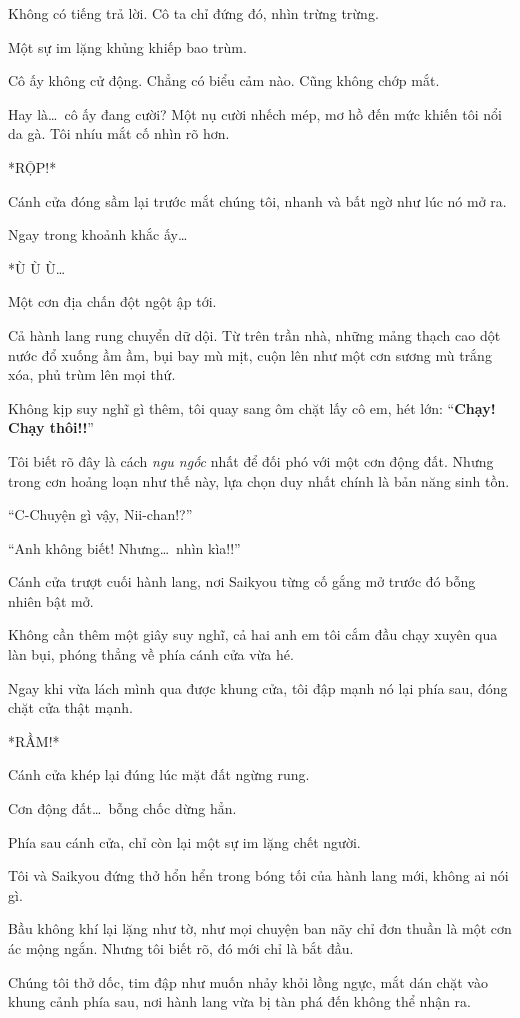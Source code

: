 \documentclass[../main.tex]{subfiles}
\begin{document}
Không có tiếng trả lời. Cô ta chỉ đứng đó, nhìn trừng trừng.

Một sự im lặng khủng khiếp bao trùm.

Cô ấy không cử động. Chẳng có biểu cảm nào. Cũng không chớp mắt.

Hay là\dots\ cô ấy đang cười? Một nụ cười nhếch mép, mơ hồ đến mức khiến tôi nổi da gà. Tôi nhíu mắt cố nhìn rõ hơn.

*RỘP!*

Cánh cửa đóng sầm lại trước mắt chúng tôi, nhanh và bất ngờ như lúc nó mở ra.

Ngay trong khoảnh khắc ấy\dots

*Ù Ù Ù\dots*

Một cơn địa chấn đột ngột ập tới.

Cả hành lang rung chuyển dữ dội. Từ trên trần nhà, những mảng thạch cao dột nước đổ xuống ầm ầm, bụi bay mù mịt, cuộn lên như một cơn sương mù trắng xóa, phủ trùm lên mọi thứ.

Không kịp suy nghĩ gì thêm, tôi quay sang ôm chặt lấy cô em, hét lớn: ``\textbf{Chạy! Chạy thôi!!}''

Tôi biết rõ đây là cách \emph{ngu ngốc} nhất để đối phó với một cơn động đất. Nhưng trong cơn hoảng loạn như thế này, lựa chọn duy nhất chính là bản năng sinh tồn.

``C-Chuyện gì vậy, Nii-chan!?''

``Anh không biết! Nhưng\dots\ nhìn kìa!!''

Cánh cửa trượt cuối hành lang, nơi Saikyou từng cố gắng mở trước đó bỗng nhiên bật mở.

Không cần thêm một giây suy nghĩ, cả hai anh em tôi cắm đầu chạy xuyên qua làn bụi, phóng thẳng về phía cánh cửa vừa hé.

Ngay khi vừa lách mình qua được khung cửa, tôi đập mạnh nó lại phía sau, đóng chặt cửa thật mạnh.

*RẦM!*

Cánh cửa khép lại đúng lúc mặt đất ngừng rung.

Cơn động đất\dots\ bỗng chốc dừng hẳn.

Phía sau cánh cửa, chỉ còn lại một sự im lặng chết người.

Tôi và Saikyou đứng thở hổn hển trong bóng tối của hành lang mới, không ai nói gì.

Bầu không khí lại lặng như tờ, như mọi chuyện ban nãy chỉ đơn thuần là một cơn ác mộng ngắn. Nhưng tôi biết rõ, đó mới chỉ là bắt đầu.

Chúng tôi thở dốc, tim đập như muốn nhảy khỏi lồng ngực, mắt dán chặt vào khung cảnh phía sau, nơi hành lang vừa bị tàn phá đến không thể nhận ra.
\end{document}

